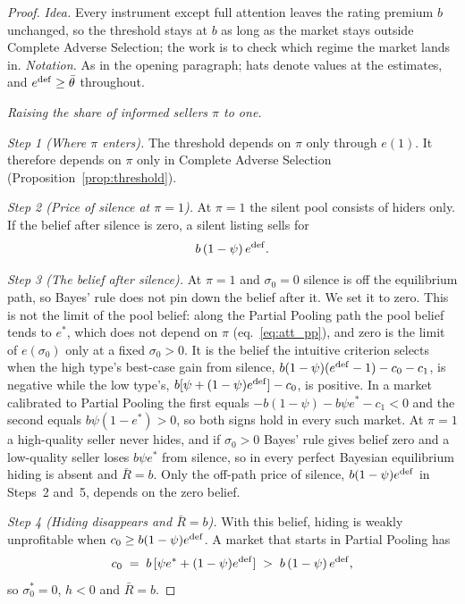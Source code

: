 \begin{proof}\upshape
\emph{Idea.} Every instrument except full attention leaves the rating premium $b$ unchanged, so the threshold stays at $b$ as long as the market stays outside Complete Adverse Selection; the work is to check which regime the market lands in. \emph{Notation.} As in the opening paragraph; hats denote values at the estimates, and $e^{\rm def}\ge\bar\theta$ throughout.

\medskip\noindent\emph{Raising the share of informed sellers $\pi$ to one.}

\emph{Step 1 (Where $\pi$ enters).} The threshold depends on $\pi$ only through $e(1)$. It therefore depends on $\pi$ only in Complete Adverse Selection (Proposition~\ref{prop:threshold}).

\emph{Step 2 (Price of silence at $\pi=1$).} At $\pi=1$ the silent pool consists of hiders only. If the belief after silence is zero, a silent listing sells for
\begin{equation*}
    b\,(1-\psi)\,e^{\rm def}.
\end{equation*}

\emph{Step 3 (The belief after silence).} At $\pi=1$ and $\sigma_0=0$ silence is off the equilibrium path, so Bayes' rule does not pin down the belief after it. We set it to zero. This is not the limit of the pool belief: along the Partial Pooling path the pool belief tends to $e^*$, which does not depend on $\pi$ (eq.~\eqref{eq:att_pp}), and zero is the limit of $e(\sigma_0)$ only at a fixed $\sigma_0>0$. It is the belief the intuitive criterion selects when the high type's best-case gain from silence, $b(1-\psi)(e^{\rm def}-1)-c_0-c_1$, is negative while the low type's, $b[\psi+(1-\psi)e^{\rm def}]-c_0$, is positive. In a market calibrated to Partial Pooling the first equals $-b(1-\psi)-b\psi e^*-c_1<0$ and the second equals $b\psi(1-e^*)>0$, so both signs hold in every such market. At $\pi=1$ a high-quality seller never hides, and if $\sigma_0>0$ Bayes' rule gives belief zero and a low-quality seller loses $b\psi e^*$ from silence, so in every perfect Bayesian equilibrium hiding is absent and $\bar R=b$. Only the off-path price of silence, $b(1-\psi)e^{\rm def}$ in Steps~2 and~5, depends on the zero belief.

\emph{Step 4 (Hiding disappears and $\bar R=b$).} With this belief, hiding is weakly unprofitable when $c_0\ge b(1-\psi)e^{\rm def}$. A market that starts in Partial Pooling has
\begin{equation*}
    c_0\;=\;b\,[\psi e^*+(1-\psi)e^{\rm def}]\;>\;b\,(1-\psi)\,e^{\rm def},
\end{equation*}
so $\sigma_0^*=0$, $h<0$ and $\bar R=b$.


\end{proof}
